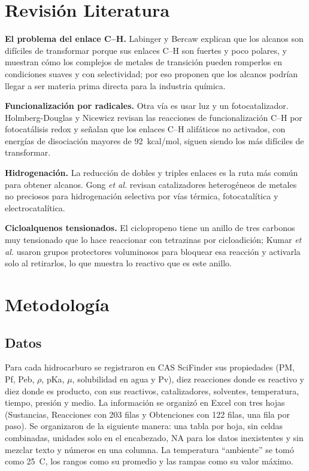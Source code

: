 \documentclass[twoside,twocolumn,10pt]{article}
\begin{document}
\section{Revisión Literatura}
\fontsize{12}{14}\selectfont
\textbf{El problema del enlace C–H.} Labinger y Bercaw \cite{Labinger2002} explican que los alcanos son difíciles de transformar porque sus enlaces C–H son fuertes y poco polares, y muestran cómo los complejos de metales de transición pueden romperlos en condiciones suaves y con selectividad; por eso proponen que los alcanos podrían llegar a ser materia prima directa para la industria química.

\textbf{Funcionalización por radicales.} Otra vía es usar luz y un fotocatalizador. Holmberg-Douglas y Nicewicz \cite{HolmbergDouglas2022} revisan las reacciones de funcionalización C–H por fotocatálisis redox y señalan que los enlaces C–H alifáticos no activados, con energías de disociación mayores de 92~kcal/mol, siguen siendo los más difíciles de transformar.

\textbf{Hidrogenación.} La reducción de dobles y triples enlaces es la ruta más común para obtener alcanos. Gong \textit{et al.} \cite{Gong2025} revisan catalizadores heterogéneos de metales no preciosos para hidrogenación selectiva por vías térmica, fotocatalítica y electrocatalítica.

\textbf{Cicloalquenos tensionados.} El ciclopropeno tiene un anillo de tres carbonos muy tensionado que lo hace reaccionar con tetrazinas por cicloadición; Kumar \textit{et al.} \cite{Kumar2018} usaron grupos protectores voluminosos para bloquear esa reacción y activarla solo al retirarlos, lo que muestra lo reactivo que es este anillo.

\section{Metodología}
\fontsize{12}{14}\selectfont
\subsection{Datos}
Para cada hidrocarburo se registraron en CAS SciFinder sus propiedades (PM, Pf, Peb, $\rho$, pKa, $\mu$, solubilidad en agua y Pv), diez reacciones donde es reactivo y diez donde es producto, con sus reactivos, catalizadores, solventes, temperatura, tiempo, presión y medio. La información se organizó en Excel con tres hojas (Sustancias, Reacciones con 203 filas y Obtenciones con 122 filas, una fila por paso). Se organizaron de la siguiente manera: una tabla por hoja, sin celdas combinadas, unidades solo en el encabezado, NA para los datos inexistentes y sin mezclar texto y números en una columna. La temperatura ``ambiente'' se tomó como 25~\textdegree C, los rangos como su promedio y las rampas como su valor máximo.
\end{document}
